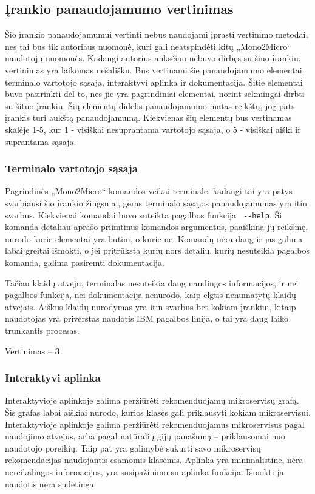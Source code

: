 \documentclass{VUMIFPSbakalaurinis}
\begin{document}
\subsection{Įrankio panaudojamumo vertinimas}
Šio įrankio panaudojamumui vertinti nebus naudojami įprasti vertinimo metodai, nes tai bus tik autoriaus nuomonė, kuri gali neatspindėti kitų „Mono2Micro“ naudotojų nuomonės. Kadangi autorius anksčiau nebuvo dirbęs su šiuo įrankiu, vertinimas yra laikomas nešališku. Bus vertinami šie panaudojamumo elementai: terminalo vartotojo sąsaja, interaktyvi aplinka ir dokumentacija. Šitie elementai buvo pasirinkti dėl to, nes jie yra pagrindiniai elementai, norint sėkmingai dirbti su šituo įrankiu. Šių elementų didelis panaudojamumo matas reikštų, jog pats įrankis turi aukštą panaudojamumą. Kiekvienas šių elementų bus vertinamas skalėje 1-5, kur 1 - visiškai nesuprantama vartotojo sąsaja, o 5 - visiškai aiški ir suprantama sąsaja.

\subsubsection{Terminalo vartotojo sąsaja}
Pagrindinės „Mono2Micro“ komandos veikai terminale. kadangi tai yra patys svarbiausi šio įrankio žingsniai, geras terminalo sąsajos panaudojamumas yra itin svarbus. Kiekvienai komandai buvo suteikta pagalbos funkcija \verb| --help|. Ši komanda detaliau aprašo priimtinus komandos argumentus, paaiškina jų reikšmę, nurodo kurie elementai yra būtini, o kurie ne. Komandų nėra daug ir jas galima labai greitai išmokti, o jei pritrūksta kurių nors detalių, kurių nesuteikia pagalbos komanda, galima pasiremti dokumentacija.

Tačiau klaidų atveju, terminalas nesuteikia daug naudingos informacijos, ir nei pagalbos funkcija, nei dokumentacija nenurodo, kaip elgtis nenumatytų klaidų atvejais. Aiškus klaidų nurodymas yra itin svarbus bet kokiam įrankiui, kitaip naudotojas yra priverstas naudotis IBM pagalbos linija, o tai yra daug laiko trunkantis procesas.

Vertinimas -- \textbf{3}.

\subsubsection{Interaktyvi aplinka}
Interaktyvioje aplinkoje galima peržiūrėti rekomenduojamų mikroservisų grafą. Šis grafas labai aiškiai nurodo, kurios klasės gali priklausyti kokiam mikroservisui. Interaktyvioje aplinkoje galima peržiūrėti rekomenduojamus mikroservisus pagal naudojimo atvejus, arba pagal natūralių gijų panašumą -- priklausomai nuo naudotojo poreikių. Taip pat yra galimybė sukurti savo mikroservisų rekomendacijas naudojantis esamomis klasėmis. Aplinka yra minimalistinė, nėra nereikalingos informacijos, yra susipažinimo su aplinka funkcija. Išmokti ja naudotis nėra sudėtinga.
\end{document}
